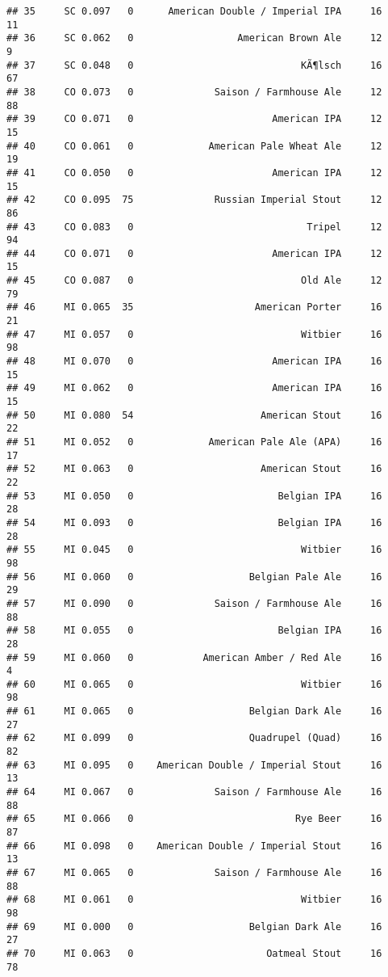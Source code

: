 \documentclass[
]{article}
\begin{document}
\begin{verbatim}
## 35     SC 0.097   0      American Double / Imperial IPA     16      11
## 36     SC 0.062   0                  American Brown Ale     12       9
## 37     SC 0.048   0                             KÃ¶lsch     16      67
## 38     CO 0.073   0              Saison / Farmhouse Ale     12      88
## 39     CO 0.071   0                        American IPA     12      15
## 40     CO 0.061   0             American Pale Wheat Ale     12      19
## 41     CO 0.050   0                        American IPA     12      15
## 42     CO 0.095  75              Russian Imperial Stout     12      86
## 43     CO 0.083   0                              Tripel     12      94
## 44     CO 0.071   0                        American IPA     12      15
## 45     CO 0.087   0                             Old Ale     12      79
## 46     MI 0.065  35                     American Porter     16      21
## 47     MI 0.057   0                             Witbier     16      98
## 48     MI 0.070   0                        American IPA     16      15
## 49     MI 0.062   0                        American IPA     16      15
## 50     MI 0.080  54                      American Stout     16      22
## 51     MI 0.052   0             American Pale Ale (APA)     16      17
## 52     MI 0.063   0                      American Stout     16      22
## 53     MI 0.050   0                         Belgian IPA     16      28
## 54     MI 0.093   0                         Belgian IPA     16      28
## 55     MI 0.045   0                             Witbier     16      98
## 56     MI 0.060   0                    Belgian Pale Ale     16      29
## 57     MI 0.090   0              Saison / Farmhouse Ale     16      88
## 58     MI 0.055   0                         Belgian IPA     16      28
## 59     MI 0.060   0            American Amber / Red Ale     16       4
## 60     MI 0.065   0                             Witbier     16      98
## 61     MI 0.065   0                    Belgian Dark Ale     16      27
## 62     MI 0.099   0                    Quadrupel (Quad)     16      82
## 63     MI 0.095   0    American Double / Imperial Stout     16      13
## 64     MI 0.067   0              Saison / Farmhouse Ale     16      88
## 65     MI 0.066   0                            Rye Beer     16      87
## 66     MI 0.098   0    American Double / Imperial Stout     16      13
## 67     MI 0.065   0              Saison / Farmhouse Ale     16      88
## 68     MI 0.061   0                             Witbier     16      98
## 69     MI 0.000   0                    Belgian Dark Ale     16      27
## 70     MI 0.063   0                       Oatmeal Stout     16      78

\end{verbatim}
\end{document}
